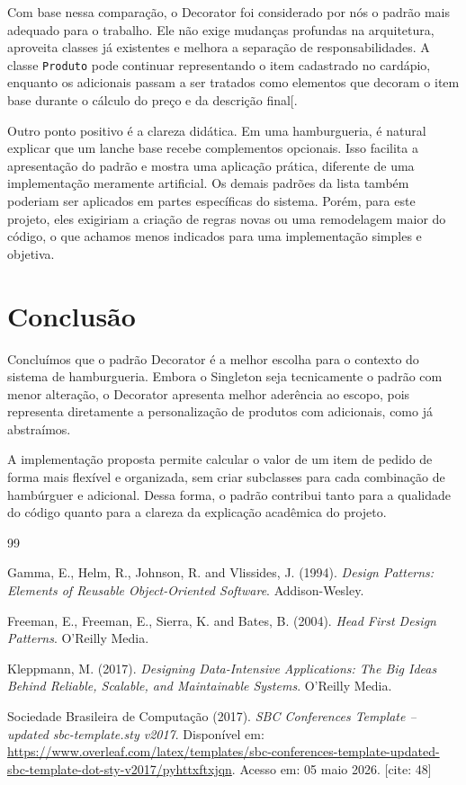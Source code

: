 \documentclass[12pt]{article}
\begin{document}
Com base nessa comparação, o Decorator foi considerado por nós o padrão mais adequado para o trabalho. Ele não exige mudanças profundas na arquitetura, aproveita classes já existentes e melhora a separação de responsabilidades. A classe \texttt{Produto} pode continuar representando o item cadastrado no cardápio, enquanto os adicionais passam a ser tratados como elementos que decoram o item base durante o cálculo do preço e da descrição final[.

Outro ponto positivo é a clareza didática. Em uma hamburgueria, é natural explicar que um lanche base recebe complementos opcionais. Isso facilita a apresentação do padrão e mostra uma aplicação prática, diferente de uma implementação meramente artificial. Os demais padrões da lista também poderiam ser aplicados em partes específicas do sistema. Porém, para este projeto, eles exigiriam a criação de regras novas ou uma remodelagem maior do código, o que achamos menos indicados para uma implementação simples e objetiva.

\section{Conclusão}

Concluímos que o padrão Decorator é a melhor escolha para o contexto do sistema de hamburgueria. Embora o Singleton seja tecnicamente o padrão com menor alteração, o Decorator apresenta melhor aderência ao escopo, pois representa diretamente a personalização de produtos com adicionais, como já abstraímos.

A implementação proposta permite calcular o valor de um item de pedido de forma mais flexível e organizada, sem criar subclasses para cada combinação de hambúrguer e adicional. Dessa forma, o padrão contribui tanto para a qualidade do código quanto para a clareza da explicação acadêmica do projeto.

\renewcommand{\refname}{Referências Bibliográficas}
\begin{thebibliography}{99}

Gamma, E., Helm, R., Johnson, R. and Vlissides, J. (1994).
\newblock \textit{Design Patterns: Elements of Reusable Object-Oriented Software}.
\newblock Addison-Wesley. 

Freeman, E., Freeman, E., Sierra, K. and Bates, B. (2004).
\newblock \textit{Head First Design Patterns}.
\newblock O'Reilly Media. 

Kleppmann, M. (2017).
\newblock \textit{Designing Data-Intensive Applications: The Big Ideas Behind Reliable, Scalable, and Maintainable Systems}.
\newblock O'Reilly Media. 

Sociedade Brasileira de Computação (2017).
\newblock \textit{SBC Conferences Template -- updated sbc-template.sty v2017}.
\newblock Disponível em: \url{https://www.overleaf.com/latex/templates/sbc-conferences-template-updated-sbc-template-dot-sty-v2017/pyhttxftxjqn}. Acesso em: 05 maio 2026. [cite: 48]

\end{thebibliography}
\end{document}
